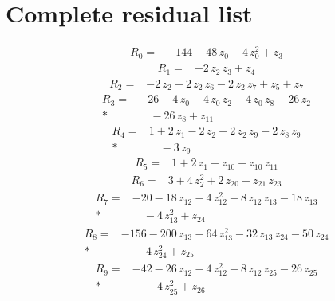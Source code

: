 \documentclass[10pt]{article}
\begin{document}
\section*{Complete residual list}
\begin{align*}
R_{0}={}& - 144 - 48\,z_{0} - 4\,z_{0}^{2} + z_{3}
\end{align*}
\begin{align*}
R_{1}={}& - 2\,z_{2}\,z_{3} + z_{4}
\end{align*}
\begin{align*}
R_{2}={}& - 2\,z_{2} - 2\,z_{2}\,z_{6} - 2\,z_{2}\,z_{7} + z_{5} + z_{7}
\end{align*}
\begin{align*}
R_{3}={}& - 26 - 4\,z_{0} - 4\,z_{0}\,z_{2} - 4\,z_{0}\,z_{8} - 26\,z_{2} \\*
&\quad - 26\,z_{8} + z_{11}
\end{align*}
\begin{align*}
R_{4}={}& 1 + 2\,z_{1} - 2\,z_{2} - 2\,z_{2}\,z_{9} - 2\,z_{8}\,z_{9} \\*
&\quad - 3\,z_{9}
\end{align*}
\begin{align*}
R_{5}={}& 1 + 2\,z_{1} - z_{10} - z_{10}\,z_{11}
\end{align*}
\begin{align*}
R_{6}={}& 3 + 4\,z_{2}^{2} + 2\,z_{20} - z_{21}\,z_{23}
\end{align*}
\begin{align*}
R_{7}={}& - 20 - 18\,z_{12} - 4\,z_{12}^{2} - 8\,z_{12}\,z_{13} - 18\,z_{13} \\*
&\quad - 4\,z_{13}^{2} + z_{24}
\end{align*}
\begin{align*}
R_{8}={}& - 156 - 200\,z_{13} - 64\,z_{13}^{2} - 32\,z_{13}\,z_{24} - 50\,z_{24} \\*
&\quad - 4\,z_{24}^{2} + z_{25}
\end{align*}
\begin{align*}
R_{9}={}& - 42 - 26\,z_{12} - 4\,z_{12}^{2} - 8\,z_{12}\,z_{25} - 26\,z_{25} \\*
&\quad - 4\,z_{25}^{2} + z_{26}
\end{align*}
\end{document}
